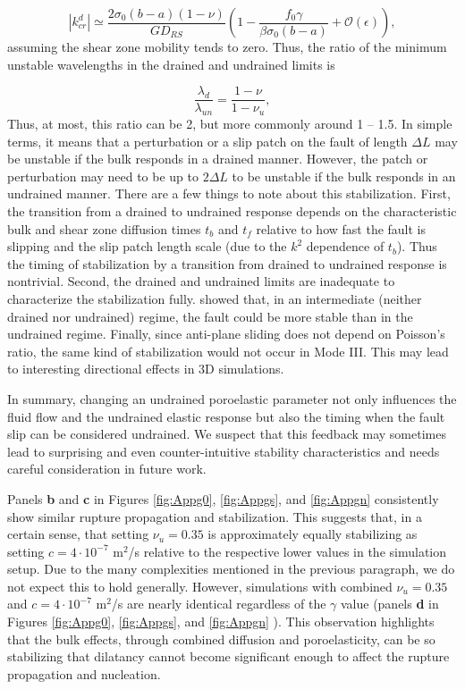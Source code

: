 \documentclass[draft]{agujournal2019}
\begin{document}
\begin{equation}
|k_{cr}^d| \simeq \frac{2 \sigma_0(b-a)(1-\nu)}{GD_{RS}} \left(1 - \frac{f_0 \gamma}{ \beta \sigma_0 (b-a) } + \mathcal{O}(\epsilon) \right) ,
\label{eq:kappa0d} 
\end{equation}
assuming the shear zone mobility tends to zero. Thus, the ratio of the minimum unstable wavelengths in the drained and undrained limits is

\begin{equation}
\frac{\lambda_d}{\lambda_{un}} = \frac{1 - \nu}{1 - \nu_u},
\end{equation}
Thus, at most, this ratio can be 2, but more commonly around 1 -- 1.5. In simple terms, it means that a perturbation or a slip patch on the fault of length $\Delta L$ may be unstable if the bulk responds in a drained manner. However, the patch or perturbation may need to be up to $2 \Delta L$ to be unstable if the bulk responds in an undrained manner. There are a few things to note about this stabilization. First, the transition from a drained to undrained response depends on the characteristic bulk and shear zone diffusion times $t_b$ and $t_f$ relative to how fast the fault is slipping and the slip patch length scale (due to the $k^2$ dependence of $t_b$). Thus the timing of stabilization by a transition from drained to undrained response is nontrivial. Second, the drained and undrained limits are inadequate to characterize the stabilization fully.  showed that, in an intermediate (neither drained nor undrained) regime, the fault could be more stable than in the undrained regime. Finally, since anti-plane sliding does not depend on Poisson's ratio, the same kind of stabilization would not occur in Mode III. This may lead to interesting directional effects in 3D simulations. 

In summary, changing an undrained poroelastic parameter not only influences the fluid flow and the undrained elastic response but also the timing when the fault slip can be considered undrained. We suspect that this feedback may sometimes lead to surprising and even counter-intuitive stability characteristics and needs careful consideration in future work.

Panels {\bf b} and {\bf c} in Figures  \ref{fig:Appg0}, \ref{fig:Appgs}, and \ref{fig:Appgn} consistently show similar rupture propagation and stabilization. This suggests that, in a certain sense, that setting $\nu_u = 0.35$ is approximately equally stabilizing as setting $c = 4 \cdot 10^{-7}$ m$^2$/s relative to the respective lower values in the simulation setup. Due to the many complexities mentioned in the previous paragraph, we do not expect this to hold generally. However, simulations with combined $\nu_u = 0.35$ and $c = 4 \cdot 10^{-7}$ m$^2$/s are nearly identical regardless of the $\gamma$ value (panels {\bf d} in Figures  \ref{fig:Appg0}, \ref{fig:Appgs}, and \ref{fig:Appgn} ). This observation highlights that the bulk effects, through combined diffusion and poroelasticity, can be so stabilizing that dilatancy cannot become significant enough to affect the rupture propagation and nucleation.
\end{document}

